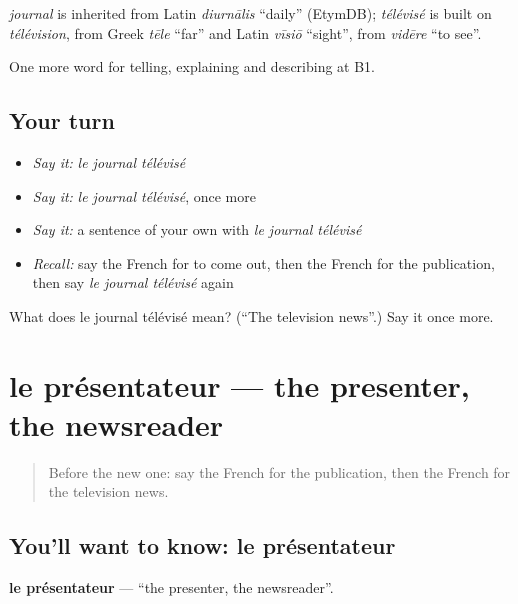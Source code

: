 \begin{cousinweb}
\emph{journal} is inherited from Latin \emph{diurnālis} \textquotedblleft{}daily\textquotedblright{} (EtymDB); \emph{télévisé} is built on \emph{télévision}, from Greek \emph{tēle} \textquotedblleft{}far\textquotedblright{} and Latin \emph{vīsiō} \textquotedblleft{}sight\textquotedblright{}, from \emph{vidēre} \textquotedblleft{}to see\textquotedblright{}.
\end{cousinweb}

\begin{grammarlens}[title={What you've built}]
One more word for telling, explaining and describing at B1.
\end{grammarlens}

\subsection*{Your turn}
\begin{itemize}
\raggedright
  \item \emph{Say it:} \emph{le journal télévisé}
  \item \emph{Say it:} \emph{le journal télévisé}, once more
  \item \emph{Say it:} a sentence of your own with \emph{le journal télévisé}
  \item \emph{Recall:} say the French for to come out, then the French for the publication, then say \emph{le journal télévisé} again
\end{itemize}

\begin{tcolorbox}[breakable,colback=teal!4,colframe=teal!35!black,title={Before you move on}]
What does le journal télévisé mean? (\textquotedblleft{}The television news\textquotedblright{}.) Say it once more.
\end{tcolorbox}
\section[le présentateur]{le présentateur — the presenter, the newsreader}

\label{lesson:FR-C280-presentateur}



\begin{quote}
Before the new one: say the French for the publication, then the French for the television news.
\end{quote}

\subsection*{You'll want to know: le présentateur}
\textbf{le présentateur} — \textquotedblleft{}the presenter, the newsreader\textquotedblright{}.

